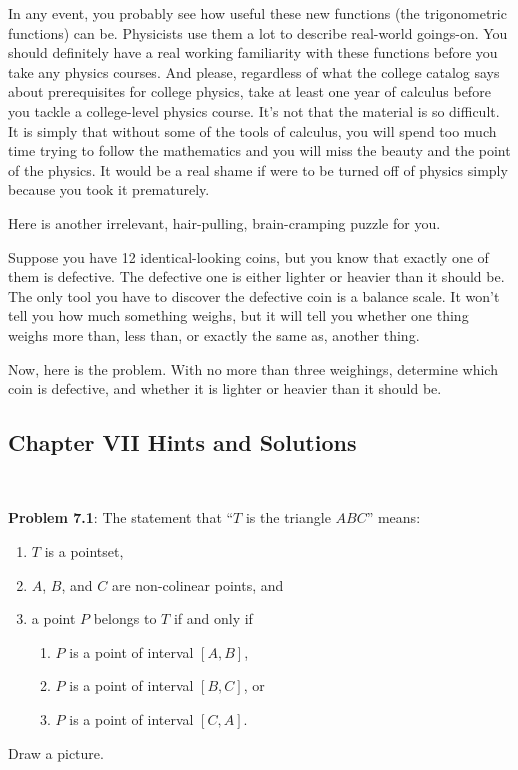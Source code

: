 \documentclass[english]{book}
\begin{document}
In any event, you probably see how useful these new functions (the trigonometric functions) can be. Physicists use them a lot to describe real-world goings-on. You should definitely have a real working familiarity with these functions before you take any physics courses. And please, regardless of what the college catalog says about prerequisites for college physics, take at least one year of calculus before you tackle a college-level physics course. It's not that the material is so difficult. It is simply that without some of the tools of calculus, you will spend too much time trying to follow the mathematics and you will miss the beauty and the point of the physics. It would be a real shame if were to be turned off of physics simply because you took it prematurely.

\vspace{0.3cm}

Here is another irrelevant, hair-pulling, brain-cramping puzzle for you.

Suppose you have 12 identical-looking coins, but you know that exactly one of them is defective. The defective one is either lighter or heavier than it should be. The only tool you have to discover the defective coin is a balance scale. It won't tell you how much something weighs, but it will tell you whether one thing weighs more than, less than, or exactly the same as, another thing. 

Now, here is the problem. With no more than three weighings, determine which coin is defective, and whether it is lighter or heavier than it should be.


\newpage
\begin{center}
\section*{Chapter VII Hints and Solutions}
\end{center}

$\ $

\textbf{Problem 7.1}: The statement that ``$T$ is the triangle $ABC$'' means:
\begin{enumerate}[\hspace{1cm}1)]
  \item $T$ is a pointset,
  \item $A$, $B$, and $C$ are non-colinear points, and
  \item a point $P$ belongs to $T$ if and only if
  \begin{enumerate}[\hspace{1cm}a)]
    \item $P$ is a point of interval $[A,B]$,
    \item $P$ is a point of interval $[B,C]$, or
    \item $P$ is a point of interval $[C,A]$.
  \end{enumerate}
\end{enumerate}
\hspace{1cm} Draw a picture.
\end{document}
